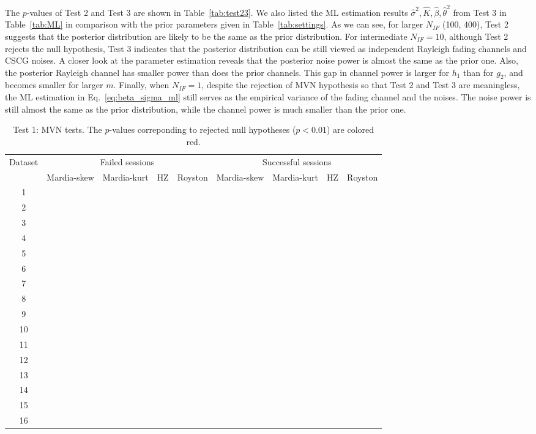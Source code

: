 \documentclass[journal,draftcls,onecolumn,12pt,twoside]{IEEEtran}
\begin{document}
The $p$-values of Test 2 and Test 3 are shown in Table~\ref{tab:test23}. We
also listed the ML estimation results $\hat{\sigma}^2, \hat{K},
\hat{\beta}, \hat{\theta}^2$ from Test 3 in Table~\ref{tab:ML} in comparison
with the prior parameters given in Table~\ref{tab:settings}. As we can see, for larger $N_{IF}$
 (100, 400), Test 2 suggests that the posterior distribution are likely to be
the same as the prior distribution. For intermediate $N_{IF} = 10$, although
Test 2 rejects the null hypothesis, Test 3 indicates that the posterior
distribution can be still viewed as independent Rayleigh fading channels and
CSCG noises. A closer look at the parameter estimation reveals that 
the posterior noise power is almost the same as the prior one. Also, the
posterior Rayleigh channel has smaller power than does the prior channels. This
gap in channel power is larger for $h_1$ than for $g_2$, and becomes smaller for
larger $m$. Finally, when $N_{IF} = 1$, despite the rejection of MVN hypothesis
so that Test 2 and Test 3 are meaningless, the ML estimation in
Eq.~\eqref{eq:beta_sigma_ml} still serves as the empirical variance of the
fading channel and the noises. The noise power is still almost the same as the
prior distribution, while the channel power is much smaller than the prior one.

\begin{table}[!t]
  \renewcommand{\arraystretch}{1.3}
  \caption{Test 1: MVN tests. The $p$-values
  correponding to rejected null hypotheses ($p < 0.01$) are colored red.}
  \label{tab:test1}
  \centering
  \begin{tabular}{c|cc|c|c|cc|c|c}
    \hline
    \multirow{2}{*}{Dataset}  & \multicolumn{4}{c|}{Failed sessions} &
    \multicolumn{4}{c}{Successful sessions} \\
    \cline{2-9}
    & Mardia-skew & Mardia-kurt & HZ & Royston & Mardia-skew & Mardia-kurt & HZ
    & Royston \\
    \hline
    1 &  &  &  &  &  &  &  &  \\
    2 &  &  &  &  &  &  &  & \\
    3 &  &  &  &  &  &  &  & \\
    4 &  &  &  &  &  &  &  & \\
    \hline
    5 &  &  &  &  &  &  &  & \\
    6 &  &  &  &  &  &  &  & \\
    7 &  &  &  &  &  &  &  & \\
    8 &  &  &  &  &  &  &  & \\
    \hline
    9 &  &  &  &  &  &  &  & \\
    10 &  &  &  &  &  &  &  & \\
    11 &  &  &  &  &  &  &  & \\
    12 &  &  &  &  &  &  &  & \\
    \hline
    13 &  &  &  &  &  &  &  & \\
    14 &  &  &  &  &  &  &  & \\
    15 &  &  &  &  &  &  &  & \\
    16 &  &  &  &  &  &  &  & \\
    \hline
  \end{tabular}
\end{table}
  
\end{document}
